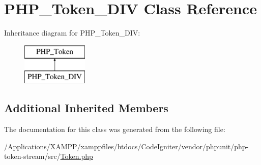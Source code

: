 \hypertarget{class_p_h_p___token___d_i_v}{}\section{P\+H\+P\+\_\+\+Token\+\_\+\+D\+IV Class Reference}
\label{class_p_h_p___token___d_i_v}
Inheritance diagram for P\+H\+P\+\_\+\+Token\+\_\+\+D\+IV\+:\begin{figure}[H]
\begin{center}
\leavevmode
\includegraphics[height=2.000000cm]{class_p_h_p___token___d_i_v}
\end{center}
\end{figure}
\subsection*{Additional Inherited Members}


The documentation for this class was generated from the following file\+:\begin{DoxyCompactItemize}
\item 
/\+Applications/\+X\+A\+M\+P\+P/xamppfiles/htdocs/\+Code\+Igniter/vendor/phpunit/php-\/token-\/stream/src/\mbox{\hyperlink{_token_8php}{Token.\+php}}\end{DoxyCompactItemize}
